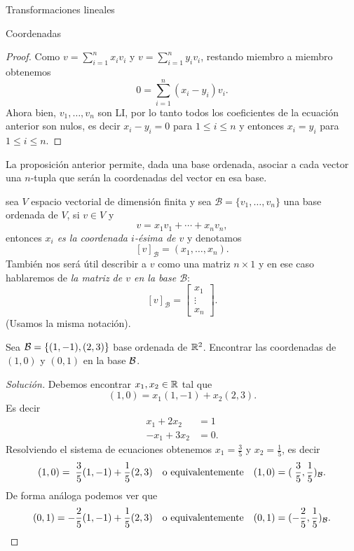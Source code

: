 \begin{chapter}{Transformaciones lineales}
\begin{section}{Coordenadas}
\begin{proof}
            Como $v =  \sum_{i=1}^{n} x_iv_i$ y $v =  \sum_{i=1}^{n} y_iv_i$,  restando miembro a miembro obtenemos 
            $$
            0 =   \sum_{i=1}^{n} (x_i-y_i)v_i.
            $$
            Ahora bien,  $v_1,\ldots,v_n$ son  LI, por lo tanto todos los coeficientes de la ecuación anterior son nulos, es decir $x_i-y_i=0$ para $1 \le i \le n$ y entonces $x_i = y_i$ para $1 \le i \le n$.
        \end{proof}
    
    La proposición anterior permite, dada una base ordenada,  asociar a cada vector una $n$-tupla que serán la coordenadas del vector en esa base.
    
    \begin{definicion}
    sea $V$  espacio vectorial de dimensión finita y sea $\mathcal{B} = \{v_1,\ldots,v_n\}$ una base ordenada de $V$, si $v \in V$ y $$v =   x_1v_1 + \cdots +x_nv_n,$$  entonces \textit{$x_i$ es la coordenada $i$-ésima de $v$} y denotamos
    $$
    [v]_\mathcal{B} = (x_1,\ldots,x_n).
    $$
    También nos será útil describir a $v$ como una matriz $n \times 1$ y en ese caso hablaremos de \textit{la matriz de $v$  en la base  $\mathcal{B}$}:
    $$
    [v]_\mathcal{B} = \begin{bmatrix}x_1 \\ \vdots \\ x_n\end{bmatrix}.
    $$
    (Usamos la misma notación).
    \end{definicion}



    \begin{ejemplo*}
        Sea $\mathcal{B} = \{(1,-1),(2,3)\}$ base ordenada de $\mathbb R^2$. Encontrar las coordenadas  de $(1,0)$ y $(0,1)$ en la base $\mathcal{B}$.
    \end{ejemplo*}
    \begin{proof}[Solución] Debemos encontrar $x_1, x_2 \in \mathbb R$ tal que 
        $$
        (1,0) = x_1(1,-1)+ x_2(2,3).
        $$
        Es decir 
        \begin{align*}
            x_1+ 2x_2 &= 1\\
            -x_1 + 3x_2 &= 0.
        \end{align*}
        Resolviendo el sistema de ecuaciones obtenemos $x_1 = \frac35$ y $x_2 = \frac15$,  es decir
        $$
        (1,0) =\; \frac35(1,-1)+ \frac15(2,3)\quad \text{o equivalentemente} \quad (1,0) = (\;\frac35,\frac15)_{\mathcal{B}}.
        $$ 
        De forma análoga podemos ver que
        $$
        (0,1) = -\frac25(1,-1)+ \frac15(2,3)\quad \text{o equivalentemente} \quad (0,1) = (-\frac25,\frac15)_{\mathcal{B}}.
        $$
    \end{proof}
    

\end{section}
\end{chapter}
